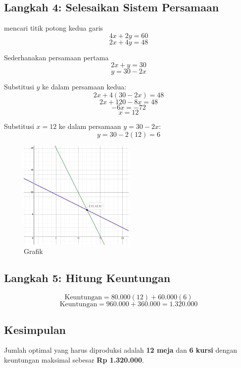 \documentclass{article}
\begin{document}
\subsection*{Langkah 4: Selesaikan Sistem Persamaan}
mencari titik potong kedua garis
\[
4x + 2y = 60
\]
\[
2x + 4y = 48
\]

Sederhanakan persamaan pertama 
\[
2x + y = 30
\]
\[
y = 30 - 2x
\]

Substitusi \( y \) ke dalam persamaan kedua:
\[
2x + 4(30 - 2x) = 48
\]
\[
2x + 120 - 8x = 48
\]
\[
-6x = -72
\]
\[
x = 12
\]

Substitusi \( x = 12 \) ke dalam persamaan \( y = 30 - 2x \):
\[
y = 30 - 2(12) = 6
\]

\begin{figure}[ht]
  \begin{center}
    \includegraphics[width=0.5\textwidth]{images/graph.png}
  \end{center}
  \caption{Grafik}\label{Grafik}
\end{figure}


\subsection*{Langkah 5: Hitung Keuntungan}
\[
\text{Keuntungan} = 80.000(12) + 60.000(6)
\]
\[
\text{Keuntungan} = 960.000 + 360.000 = 1.320.000
\]

\subsection*{Kesimpulan}
Jumlah optimal yang harus diproduksi adalah \textbf{12 meja} dan \textbf{6 kursi} dengan keuntungan maksimal sebesar \textbf{Rp 1.320.000}.
\end{document}
